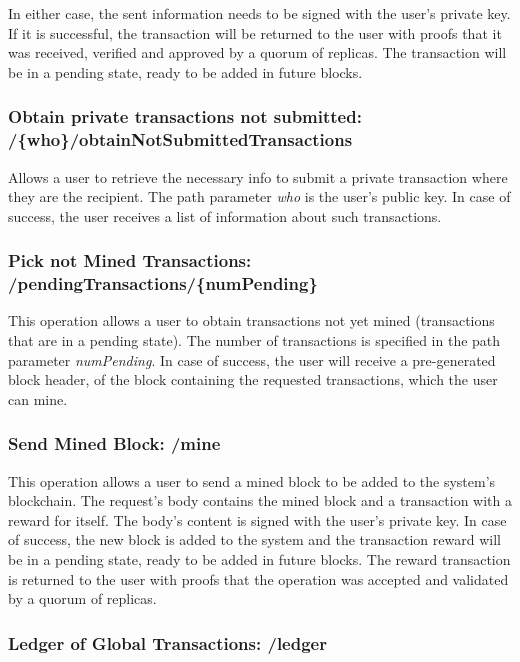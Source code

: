 \documentclass[10pt,journal,compsoc]{IEEEtran}
\begin{document}
	In either case, the sent information needs to be signed with the user's private key. If it is successful, the transaction will be returned to the user with proofs that it was received, verified and approved by a quorum of replicas. The transaction will be in a pending state, ready to be added in future blocks.

	
	\subsubsection{Obtain private transactions not submitted: \textbf{/\{who\}/obtainNotSubmittedTransactions} }
	
	Allows a user to retrieve the necessary info to submit a private transaction where they are the recipient. The path parameter \textit{who} is the user's public key. In case of success, the user receives a list of information about such transactions.

	\subsubsection{Pick not Mined Transactions: \textbf{/pendingTransactions/\{numPending\}} }
	
	This operation allows a user to obtain transactions not yet mined (transactions that are in a pending state). The number of transactions is specified in the path parameter \textit{numPending}. In case of success, the user will receive a pre-generated block header, of the block containing the requested transactions, which the user can mine.
	
	\subsubsection{Send Mined Block: \textbf{/mine} }
	
	This operation allows a user to send a mined block to be added to the system's blockchain. The request's body contains the mined block and a transaction with a reward for itself. The body's content is signed with the user's private key. In case of success, the new block is added to the system and the transaction reward will be in a pending state, ready to be added in future blocks. The reward transaction is returned to the user with proofs that the operation was accepted and validated by a quorum of replicas.
	
	
	\subsubsection{Ledger of Global Transactions: \textbf{/ledger} }
	
\end{document}
